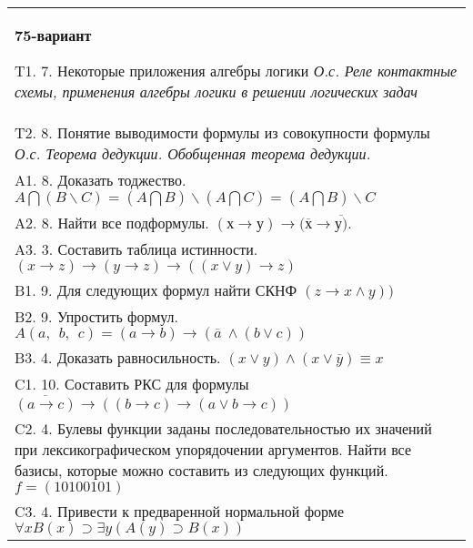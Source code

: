 \documentclass{article}
\begin{document}
\begin{tabular}{m{17cm}}
\textbf{75-вариант}
\newline

T1. 7. Некоторые приложения алгебры логики \emph{О.с. Реле контактные схемы, применения алгебры логики в решении логических задач} \\
T2. 8. Понятие выводимости формулы из совокупности формулы \emph{О.с. Теорема дедукции. Обобщенная теорема дедукции.} \\
A1. 8. Доказать тоджество. \(A\bigcap(B\backslash C) = (A\bigcap B)\backslash(A\bigcap C) = (A\bigcap B)\backslash C\) \\
A2. 8. Найти все подформулы. \((х \rightarrow у) \rightarrow (\overline{х} \rightarrow \overline{у)}\). \\
A3. 3. Составить таблица истинности. \((x \rightarrow z) \rightarrow (y \rightarrow z) \rightarrow ((x \vee y) \rightarrow z)\) \\
B1. 9. Для следующих формул найти СКНФ \((z \rightarrow x \land y))\) \\
B2. 9. Упростить формул. \(A(a,\ \ b,\ \ c) = (a \rightarrow b) \rightarrow (\overline{a}\  \land (b \vee c))\) \\
B3. 4. Доказать равносильность. \((x \vee y) \land (x \vee \overline{y}) \equiv x\) \\
C1. 10. Составить РКС для формулы \(\overline{(a \rightarrow c)} \rightarrow \left( (b \rightarrow c) \rightarrow (a \vee b \rightarrow c) \right)\) \\
C2. 4. Булевы функции заданы последовательностью их значений при лексикографическом упорядочении аргументов. Найти все базисы, которые можно составить из следующих функций. \(f = (10100101)\) \\
C3. 4. Привести к предваренной нормальной форме \(\forall xB(x) \supset \exists y(A(y) \supset B(x))\) \\

\end{tabular}
\vspace{1cm}
\end{document}
